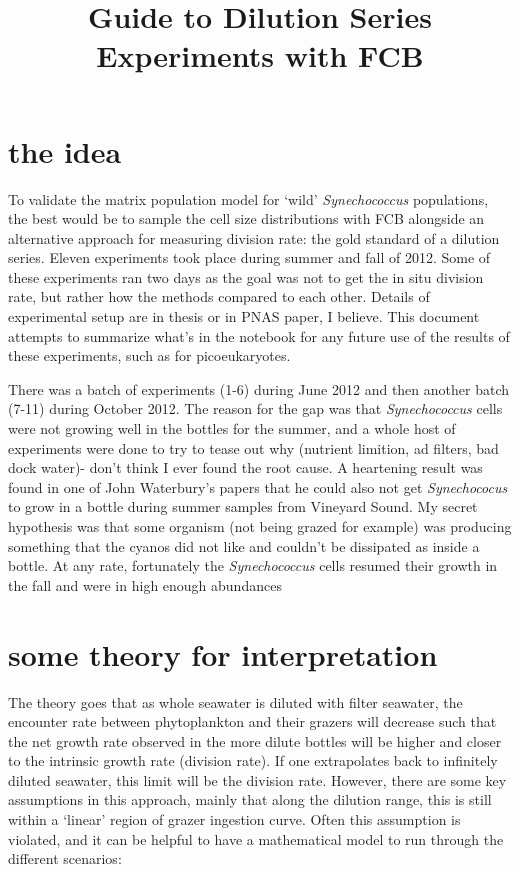 \documentclass[11pt]{article}
\title{Guide to Dilution Series Experiments with FCB}
\begin{document}
\maketitle

\section{the idea}
To validate the matrix population model for `wild' \textit{Synechococcus} populations, the best would be to sample the cell size distributions with FCB alongside an alternative approach for measuring division rate: the gold standard of a dilution series. Eleven experiments took place during summer and fall of 2012. Some of these experiments ran two days as the goal was not to get the in situ division rate, but rather how the methods compared to each other. Details of experimental setup are in thesis or in PNAS paper, I believe. This document attempts to summarize what's in the notebook for any future use of the results of these experiments, such as for picoeukaryotes.

There was a batch of experiments (1-6) during June 2012 and then another batch (7-11) during October 2012. The reason for the gap was that \textit{Synechococcus} cells were not growing well in the bottles for the summer, and a whole host of experiments were done to try to tease out why (nutrient limition, ad filters, bad dock water)- don't think I ever found the root cause. A heartening result was found in one of John Waterbury's papers that he could also not get \textit{Synechococus} to grow in a bottle during summer samples from Vineyard Sound. My secret hypothesis was that some organism (not being grazed for example) was producing something that the cyanos did not like and couldn't be dissipated as inside a bottle. At any rate, fortunately the \textit{Synechococcus} cells resumed their growth in the fall and were in high enough abundances 


\section{some theory for interpretation}

The theory goes that as whole seawater is diluted with filter seawater, the encounter rate between phytoplankton and their grazers will decrease such that the net growth rate observed in the more dilute bottles will be higher and closer to the intrinsic growth rate (division rate). If one extrapolates back to infinitely diluted seawater, this limit will be the division rate. However, there are some key assumptions in this approach, mainly that along the dilution range, this is still within a `linear' region of grazer ingestion curve. Often this assumption is violated, and it can be helpful to have a mathematical model to run through the different scenarios:
\end{document}
